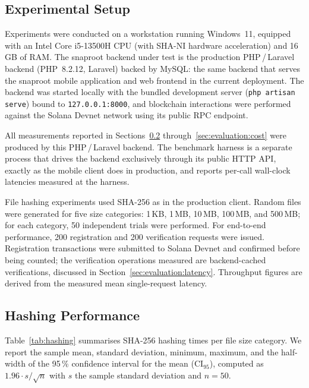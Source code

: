 \documentclass[11pt,a4paper]{article}
\begin{document}
\subsection{Experimental Setup}
\label{sec:evaluation:setup}

Experiments were conducted on a workstation running Windows~11,
equipped with an Intel Core i5-13500H CPU (with SHA-NI hardware
acceleration) and 16\,GB of RAM. The snaproot backend under test is
the production PHP\,/\,Laravel backend (PHP~8.2.12, Laravel) backed by
MySQL: the same backend that serves the snaproot mobile application and
web frontend in the current deployment. The backend was started locally
with the bundled development server (\texttt{php artisan serve}) bound
to \texttt{127.0.0.1:8000}, and blockchain interactions were performed
against the Solana Devnet network using its public RPC endpoint.

All measurements reported in Sections~\ref{sec:evaluation:hashing}
through~\ref{sec:evaluation:cost} were produced by this
PHP\,/\,Laravel backend. The benchmark harness is a separate process
that drives the backend exclusively through its public HTTP API,
exactly as the mobile client does in production, and reports
per-call wall-clock latencies measured at the harness.

File hashing experiments used SHA-256 as in the production client.
Random files were generated for five size categories: 1\,KB, 1\,MB,
10\,MB, 100\,MB, and 500\,MB; for each category, 50 independent trials
were performed. For end-to-end performance, 200 registration and 200
verification requests were issued. Registration transactions were
submitted to Solana Devnet and confirmed before being counted; the
verification operations measured are backend-cached verifications,
discussed in Section~\ref{sec:evaluation:latency}. Throughput figures
are derived from the measured mean single-request latency.

\subsection{Hashing Performance}
\label{sec:evaluation:hashing}

Table~\ref{tab:hashing} summarises SHA-256 hashing times per file size
category. We report the sample mean, standard deviation, minimum,
maximum, and the half-width of the 95\,\% confidence interval for the
mean ($\mathrm{CI}_{95}$), computed as $1.96 \cdot s/\sqrt{n}$ with
$s$ the sample standard deviation and $n = 50$.
\end{document}

